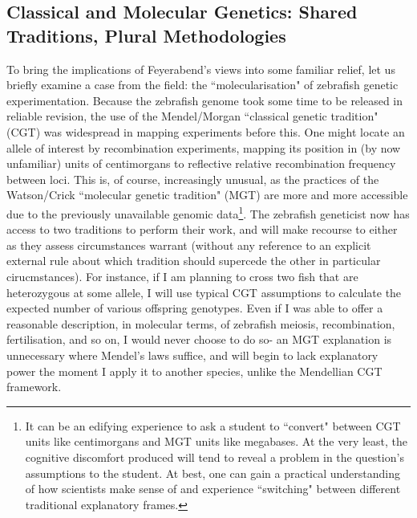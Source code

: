 \subsection {Classical and Molecular Genetics: Shared Traditions, Plural Methodologies}
\label{PS}
To bring the implications of Feyerabend's views into some familiar relief, let us briefly examine a case from the field: the ``molecularisation" of zebrafish genetic experimentation. Because the zebrafish genome took some time to be released in reliable revision, the use of the Mendel/Morgan ``classical genetic tradition" (CGT) was widespread in mapping experiments before this. One might locate an allele of interest by recombination experiments, mapping its position in (by now unfamiliar) units of centimorgans to reflective relative recombination frequency between loci. This is, of course, increasingly unusual, as the practices of the Watson/Crick ``molecular genetic tradition" (MGT) are more and more accessible due to the previously unavailable genomic data\footnote{It can be an edifying experience to ask a student to ``convert" between CGT units like centimorgans and MGT units like megabases. At the very least, the cognitive discomfort produced will tend to reveal a problem in the question's assumptions to the student. At best, one can gain a practical understanding of how scientists make sense of and experience ``switching" between different traditional explanatory frames.}. The zebrafish geneticist now has access to two traditions to perform their work, and will make recourse to either as they assess circumstances warrant (without any reference to an explicit external rule about which tradition should supercede the other in particular cirucmstances). For instance, if I am planning to cross two fish that are heterozygous at some allele, I will use typical CGT assumptions to calculate the expected number of various offspring genotypes. Even if I was able to offer a reasonable description, in molecular terms, of zebrafish meiosis, recombination, fertilisation, and so on, I would never choose to do so- an MGT explanation is unnecessary where Mendel's laws suffice, and will begin to lack explanatory power the moment I apply it to another species, unlike the Mendellian CGT framework.

